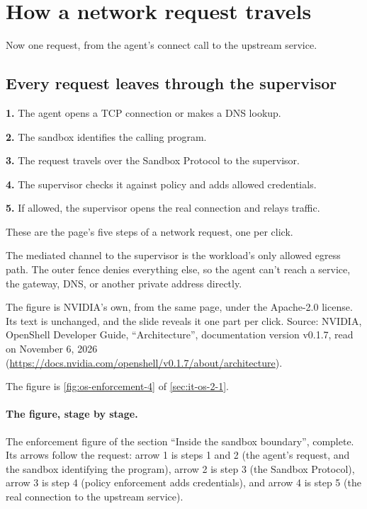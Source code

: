 \section{How a network request travels}
\label{sec:row-p1-2}

Now one request, from the agent's connect call to the upstream service.

\subsection{Every request leaves through the supervisor}
\label{sec:it-os-3-1}

\bi
\item \textbf{1.} The agent opens a TCP connection or makes a DNS lookup.
\item \textbf{2.} The sandbox identifies the calling program.
\item \textbf{3.} The request travels over the Sandbox Protocol to the supervisor.
\item \textbf{4.} The supervisor checks it against policy and adds allowed credentials.
\item \textbf{5.} If allowed, the supervisor opens the real connection and relays traffic.
\ei

These are the page's five steps of a network request, one per click.

The mediated channel to the supervisor is the workload's only allowed egress path. The outer fence denies everything else, so the agent can't reach a service, the gateway, DNS, or another private address directly.

The figure is NVIDIA's own, from the same page, under the Apache-2.0 license. Its text is unchanged, and the slide reveals it one part per click. Source: NVIDIA, OpenShell Developer Guide, ``Architecture'', documentation version v0.1.7, read on November 6, 2026 (\url{https://docs.nvidia.com/openshell/v0.1.7/about/architecture}).

The figure is \cref{fig:os-enforcement-4} of \cref{sec:it-os-2-1}.

\paragraph{The figure, stage by stage.}
\be
\item The enforcement figure of the section ``Inside the sandbox boundary'', complete. Its arrows follow the request: arrow 1 is steps 1 and 2 (the agent's request, and the sandbox identifying the program), arrow 2 is step 3 (the Sandbox Protocol), arrow 3 is step 4 (policy enforcement adds credentials), and arrow 4 is step 5 (the real connection to the upstream service).
\ee

